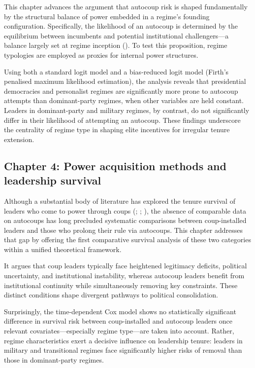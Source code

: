 \documentclass[
  12pt,
]{report}
\begin{document}
This chapter advances the argument that autocoup risk is shaped
fundamentally by the structural balance of power embedded in a regime's
founding configuration. Specifically, the likelihood of an autocoup is
determined by the equilibrium between incumbents and potential
institutional challengers---a balance largely set at regime inception
(). To test
this proposition, regime typologies are employed as proxies for internal
power structures.

Using both a standard logit model and a bias-reduced logit model
(Firth's penalised maximum likelihood estimation), the analysis reveals
that presidential democracies and personalist regimes are significantly
more prone to autocoup attempts than dominant-party regimes, when other
variables are held constant. Leaders in dominant-party and military
regimes, by contrast, do not significantly differ in their likelihood of
attempting an autocoup. These findings underscore the centrality of
regime type in shaping elite incentives for irregular tenure extension.

\subsection*{Chapter 4: Power acquisition methods and leadership
survival}\label{chapter-4-power-acquisition-methods-and-leadership-survival}

Although a substantial body of literature has explored the tenure
survival of leaders who come to power through coups
(;
;
), the absence of
comparable data on autocoups has long precluded systematic comparisons
between coup-installed leaders and those who prolong their rule via
autocoups. This chapter addresses that gap by offering the first
comparative survival analysis of these two categories within a unified
theoretical framework.

It argues that coup leaders typically face heightened legitimacy
deficits, political uncertainty, and institutional instability, whereas
autocoup leaders benefit from institutional continuity while
simultaneously removing key constraints. These distinct conditions shape
divergent pathways to political consolidation.

Surprisingly, the time-dependent Cox model shows no statistically
significant difference in survival risk between coup-installed and
autocoup leaders once relevant covariates---especially regime type---are
taken into account. Rather, regime characteristics exert a decisive
influence on leadership tenure: leaders in military and transitional
regimes face significantly higher risks of removal than those in
dominant-party regimes.
\end{document}
